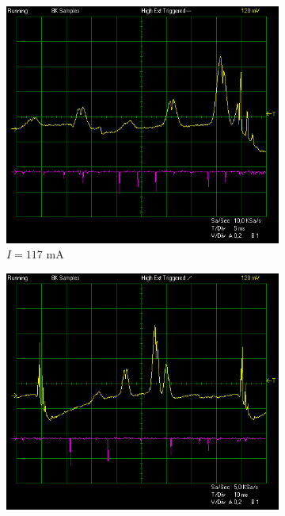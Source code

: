 \documentclass{article}
\begin{document}
\begin{figure}[h]
    \centering
    \begin{subfigure}[b]{0.3\textwidth}
        \includegraphics[width=\textwidth]{Figures/2/Tconst20C/117mA.jpg}
        \caption{$I=117$ mA}
        \label{fig:117mA}
    \end{subfigure}
    \begin{subfigure}[b]{0.3\textwidth}
        \includegraphics[width=\textwidth]{Figures/2/Tconst20C/118mA.jpg}

\end{subfigure}
\end{figure}
\end{document}

